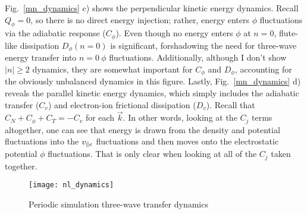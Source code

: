 Fig.~\ref{mn_dynamics} c) shows the perpendicular kinetic energy dynamics. Recall $Q_\phi = 0$, so there is no direct energy injection; rather, energy enters $\phi$ fluctuations via the adiabatic
response ($C_\phi$). Even though no energy enters $\phi$ at $n=0$, flute-like dissipation $D_\phi(n=0)$ is significant, forshadowing the need for three-wave energy transfer into $n=0 \ \phi$ 
fluctuations. Additionally, although I don't show $|n| \ge 2$ dynamics, they are somewhat important for $C_\phi$ and $D_\phi$, accounting for the obviously unbalanced dynamics in this figure.
Lastly, Fig.~\ref{mn_dynamics} d) reveals the parallel kinetic energy dynamics, which simply includes the adiabatic transfer ($C_v$) and electron-ion frictional dissipation ($D_v$). Recall that
$C_N + C_\phi + C_T = - C_v$ for each $\vec{k}$. In other words, looking at the $C_j$ terms altogether,
one can see that energy is drawn from the density and potential fluctuations into the $v_{\parallel e}$ fluctuations and then moves onto the electrostatic potential $\phi$
fluctuations. That is only clear when looking at all of the $C_j$ taken together.

\begin{figure}[!ht]
\centerline{\texttt{[image: nl\_dynamics]}}
\caption{Periodic simulation three-wave transfer dynamics}
\label{nl_dynamics}
\end{figure}

